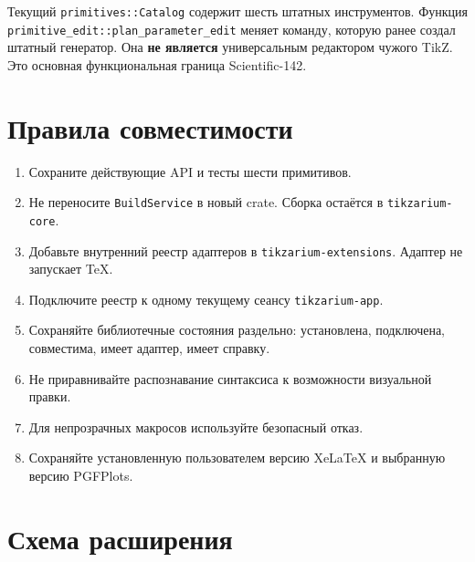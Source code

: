 \documentclass[11pt,a4paper,oneside]{scrreprt}
\providecommand{\tightlist}{\setlength{\itemsep}{0pt}\setlength{\parskip}{0pt}}
\begin{document}
Текущий \texttt{primitives::Catalog} содержит шесть штатных инструментов. Функция \texttt{primitive\_edit::plan\_parameter\_edit} меняет команду, которую ранее создал штатный генератор. Она \textbf{не является} универсальным редактором чужого TikZ. Это основная функциональная граница Scientific-142.

\section{Правила совместимости}\label{ux43fux440ux430ux432ux438ux43bux430-ux441ux43eux432ux43cux435ux441ux442ux438ux43cux43eux441ux442ux438}

\begin{enumerate}
\def\labelenumi{\arabic{enumi}.}
\tightlist
\item
  Сохраните действующие API и тесты шести примитивов.
\item
  Не переносите \texttt{BuildService} в новый crate. Сборка остаётся в \texttt{tikzarium-core}.
\item
  Добавьте внутренний реестр адаптеров в \texttt{tikzarium-extensions}. Адаптер не запускает TeX.
\item
  Подключите реестр к одному текущему сеансу \texttt{tikzarium-app}.
\item
  Сохраняйте библиотечные состояния раздельно: установлена, подключена, совместима, имеет адаптер, имеет справку.
\item
  Не приравнивайте распознавание синтаксиса к возможности визуальной правки.
\item
  Для непрозрачных макросов используйте безопасный отказ.
\item
  Сохраняйте установленную пользователем версию XeLaTeX и выбранную версию PGFPlots.
\end{enumerate}

\section{Схема расширения}\label{ux441ux445ux435ux43cux430-ux440ux430ux441ux448ux438ux440ux435ux43dux438ux44f}
\end{document}
